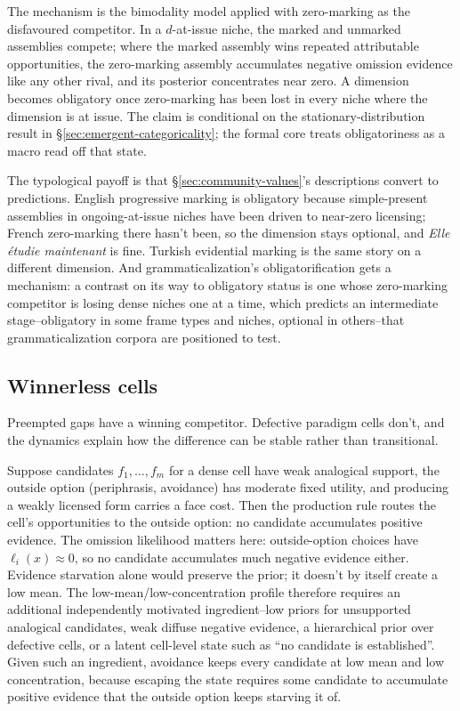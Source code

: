 \documentclass[12pt,letterpaper]{article}
\newcommand{\mention}[1]{\textit{#1}}
\begin{document}
The mechanism is the bimodality model applied with zero-marking as the
disfavoured competitor. In a $d$-at-issue niche, the marked and unmarked
assemblies compete; where the marked assembly wins repeated attributable
opportunities, the zero-marking assembly accumulates negative omission evidence
like any other rival, and its posterior concentrates near zero. A dimension
becomes obligatory once zero-marking has been lost in every niche where the
dimension is at issue. The claim is conditional on the stationary-distribution
result in \S\ref{sec:emergent-categoricality}; the formal core treats
obligatoriness as a macro read off that state.

The typological payoff is that \S\ref{sec:community-values}'s descriptions
convert to predictions. English progressive marking is obligatory because
simple-present assemblies in ongoing-at-issue niches have been driven to
near-zero licensing; French zero-marking there hasn't been, so the dimension
stays optional, and \mention{Elle étudie maintenant} is fine. Turkish
evidential marking is the same story on a different dimension. And
grammaticalization's obligatorification gets a mechanism: a contrast on its way
to obligatory status is one whose zero-marking competitor is losing dense
niches one at a time, which predicts an intermediate stage--obligatory in some
frame types and niches, optional in others--that grammaticalization corpora are
positioned to test.

\subsection{Winnerless cells}
\label{sec:winnerless-cells}

Preempted gaps have a winning competitor. Defective paradigm cells don't, and
the dynamics explain how the difference can be stable rather than transitional.

Suppose candidates $f_1,\dots,f_m$ for a dense cell have weak analogical support,
the outside option (periphrasis, avoidance) has moderate fixed utility, and
producing a weakly licensed form carries a face cost. Then the production rule
routes the cell's opportunities to the outside option: no candidate accumulates
positive evidence. The omission likelihood matters here: outside-option choices
have $\ell_i(x)\approx0$, so no candidate accumulates much negative evidence
either. Evidence starvation alone would preserve the prior; it doesn't by itself
create a low mean. The low-mean/low-concentration profile therefore requires an
additional independently motivated ingredient--low priors for unsupported
analogical candidates, weak diffuse negative evidence, a hierarchical prior over
defective cells, or a latent cell-level state such as \enquote{no candidate is
established}. Given such an ingredient, avoidance keeps every candidate at low
mean and low concentration, because escaping the state requires some candidate
to accumulate positive evidence that the outside option keeps starving it of.
\end{document}
